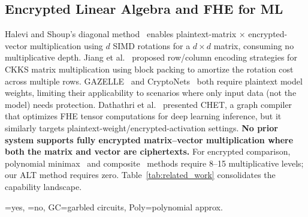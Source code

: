 \documentclass[conference]{IEEEtran}
\begin{document}
\subsection{Encrypted Linear Algebra and FHE for ML}

Halevi and Shoup's diagonal method~\cite{Halevi2014} enables plaintext-matrix $\times$ encrypted-vector multiplication using $d$ SIMD rotations for a $d \times d$ matrix, consuming no multiplicative depth. Jiang et al.~\cite{Jiang2018} proposed row/column encoding strategies for CKKS matrix multiplication using block packing to amortize the rotation cost across multiple rows. GAZELLE~\cite{Juvekar2018} and CryptoNets~\cite{CryptoNets2016} both require plaintext model weights, limiting their applicability to scenarios where only input data (not the model) needs protection. Dathathri et al.~\cite{Dathathri2019} presented CHET, a graph compiler that optimizes FHE tensor computations for deep learning inference, but it similarly targets plaintext-weight/encrypted-activation settings. \textbf{No prior system supports fully encrypted matrix--vector multiplication where both the matrix and vector are ciphertexts.} For encrypted comparison, polynomial minimax~\cite{Kim2018comparison} and composite~\cite{Cheon2019comparison} methods require 8--15 multiplicative levels; our ALT method requires zero. Table~\ref{tab:related_work} consolidates the capability landscape.

\begin{table}[!t]
\centering
\caption{Capability Comparison with Related Work}
\label{tab:related_work}
\footnotesize
{}
\vspace{1pt}
\raggedright\footnotesize{=yes, =no, GC=garbled circuits, Poly=polynomial approx.}
\end{table}
\end{document}
